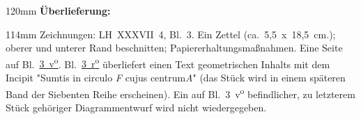 
\vspace*{-1mm}
\begin{ledgroupsized}[r]{120mm}
\footnotesize
\pstart
\noindent\textbf{Überlieferung:}
\pend
\end{ledgroupsized}
\begin{ledgroupsized}[r]{114mm}
\footnotesize
\pstart
\parindent -6mm
%
Zeichnungen:
LH~XXXVII~4, Bl.~3.
Ein Zettel (ca.~5,5~x~18,5~cm.); oberer und unterer Rand beschnitten;
Papiererhaltungsmaßnahmen.
Eine Seite auf Bl.~\href{\Scan{LH_37_04_003v}}%
{3~v\textsuperscript{o}}.
Bl.~\href{\Scan{LH_37_04_003r}}%
{3~r\textsuperscript{o}}
überliefert einen Text geometrischen Inhalts mit dem Incipit "Sumtis in circulo \textit{F} cujus centrum\;\textit{A}" (das Stück wird in einem späteren Band der Siebenten Reihe erscheinen). 
Ein auf Bl.~3~v\textsuperscript{o} befindlicher, zu letzterem Stück gehöriger Diagrammentwurf wird nicht wiedergegeben.
\pend
\end{ledgroupsized}
\vspace{5mm}
